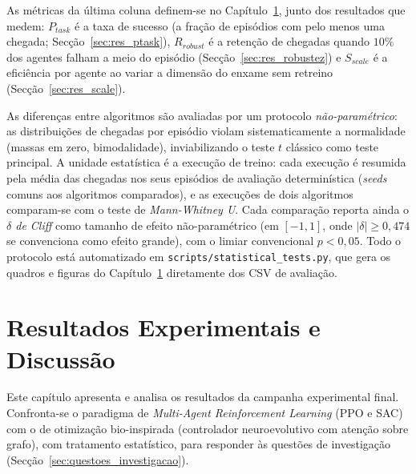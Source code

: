 \documentclass[12pt,reqno, twoside]{amsbook}
\theoremstyle{plain}
\numberwithin{equation}{chapter}
\numberwithin{section}{chapter}
\numberwithin{table}{chapter}
\numberwithin{figure}{chapter}
\begin{document}
As métricas da última coluna definem-se no Capítulo~\ref{ch:results}, junto dos resultados que medem: $P_{task}$ é a taxa de sucesso (a fração de episódios com pelo menos uma chegada; Secção~\ref{sec:res_ptask}), $R_{robust}$ é a retenção de chegadas quando $10\%$ dos agentes falham a meio do episódio (Secção~\ref{sec:res_robustez}) e $S_{scale}$ é a eficiência por agente ao variar a dimensão do enxame sem retreino (Secção~\ref{sec:res_scale}).

As diferenças entre algoritmos são avaliadas por um protocolo \emph{não-paramétrico}: as distribuições de chegadas por episódio violam sistematicamente a normalidade (massas em zero, bimodalidade), inviabilizando o teste $t$ clássico como teste principal. A unidade estatística é a execução de treino: cada execução é resumida pela média das chegadas nos seus episódios de avaliação determinística (\textit{seeds} comuns aos algoritmos comparados), e as execuções de dois algoritmos comparam-se com o teste de \emph{Mann-Whitney U}. Cada comparação reporta ainda o \emph{$\delta$ de Cliff} como tamanho de efeito não-paramétrico (em $[-1, 1]$, onde $|\delta| \ge 0{,}474$ se convenciona como efeito grande), com o limiar convencional $p < 0{,}05$. Todo o protocolo está automatizado em \texttt{scripts/statistical\_tests.py}, que gera os quadros e figuras do Capítulo~\ref{ch:results} diretamente dos CSV de avaliação.


\chapter{Resultados Experimentais e Discussão}
\label{ch:results}

Este capítulo apresenta e analisa os resultados da campanha experimental final. Confronta-se o paradigma de \textit{Multi-Agent Reinforcement Learning} (PPO e SAC) com o de otimização bio-inspirada (controlador neuroevolutivo com atenção sobre grafo), com tratamento estatístico, para responder às questões de investigação (Secção~\ref{sec:questoes_investigacao}).
\end{document}

